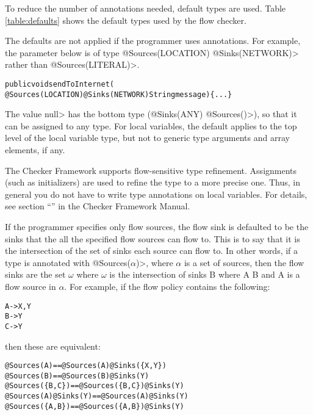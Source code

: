 To reduce the number of annotations needed, default types are
used. Table \ref{table:defaults} shows the default types used by the
flow checker.


The defaults are not applied if the programmer uses annotations.  For
example, the parameter below is of type
\<@Sources(LOCATION) @Sinks(NETWORK)>
rather than  \<@Sources({LITERAL})>.

\begin{alltt}
public void sendToInternet(
    @Sources(LOCATION) @Sinks(NETWORK) String message)\{...\}
\end{alltt} 

The value \<null> has the bottom type (\<@Sinks(ANY)
@Sources(\ttcbs)>),
so that it can be assigned to any type. For local variables, the
default applies to the top level of the local variable type, but not
to generic type arguments and array elements, if any.

The Checker Framework supports flow-sensitive type refinement.  Assignments (such as
initializers) are used to refine the type to a more precise one.  Thus, in
general you do not have to write type annotations on local variables.  For
details, see section ``'' in the Checker Framework Manual.

If the programmer specifies only flow sources, the flow sink is defaulted
to be the
sinks that the all the specified flow sources can flow to. This is to say that 
it is the intersection of the set of sinks each source can flow to.
 In other words, if a type is annotated with 
\<@Sources($\alpha$)>, where $\alpha$ is a set of sources, then the flow sinks are the set 
$\omega$ where $\omega$ is the intersection of sinks B where A \flowsto{} B and A is a flow source in 
$\alpha$.  For example, if the flow policy contains the following:

\begin{alltt}
  A -> X,Y
  B -> Y
  C -> Y
\end{alltt}
  
\noindent 
then these are equivalent:

\begin{alltt}
  @Sources(A)                 ==   @Sources(A) @Sinks(\{X, Y\})
  @Sources(B)                 ==   @Sources(B) @Sinks(Y)
  @Sources(\{B,C\})             ==   @Sources(\{B,C\}) @Sinks(Y)
  @Sources(A) @Sinks(Y)   ==   @Sources(A) @Sinks(Y) 
  @Sources(\{A,B\})             ==   @Sources(\{A,B\}) @Sinks(Y)
\end{alltt}


